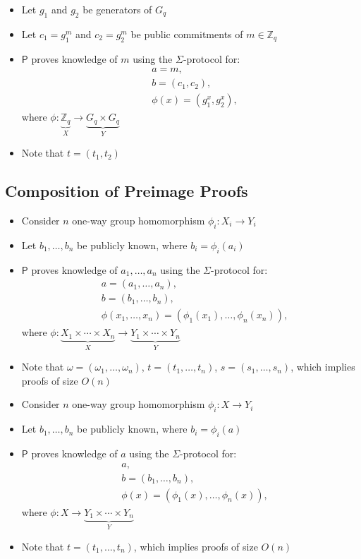 \documentclass[bibtotoc,halfparskip,oneside]{scrreprt}
\newcommand{\Prover}{\ensuremath{\mathsf{P}}\xspace}
\begin{document}
	\begin{itemize}
		\item Let $g_1$ and $g_2$ be generators of $G_q$
		\item Let $c_1=g_1^{m}$ and $c_2=g_2^{m}$ be public commitments of $m\in\mathbb{Z}_q$ 
		\item $\Prover$ proves knowledge of $m$ using the $\Sigma$-protocol for:
		\begin{align*}
			 &a=m,\\
			 &b=(c_1,c_2),\\
			 &\phi(x)=(g_1^{x},g_2^{x}),
		\end{align*}
		where $\phi:\underbrace{\mathbb{Z}_q}_X\rightarrow \underbrace{G_q\times G_q}_Y$
		\item Note that $t=(t_1,t_2)$
	\end{itemize}

\subsection{Composition of Preimage Proofs}

	\begin{itemize}
		\item Consider $n$ one-way group homomorphism $\phi_i:X_i\rightarrow Y_i$ 
		\item Let $b_1,\ldots,b_n$ be publicly known, where $b_i=\phi_i(a_i)$
		\item $\Prover$ proves knowledge of $a_1,\ldots,a_n$ using the $\Sigma$-protocol for:
		\begin{align*}
			&a=(a_1,\ldots,a_n),\\
			&b=(b_1,\ldots,b_n),\\
			&\phi(x_1,\ldots,x_n)=(\phi_1(x_1),\ldots,\phi_n(x_n)),
		\end{align*}
		where $\phi: \underbrace{X_1\times\cdots\times X_n}_X\rightarrow \underbrace{Y_1\times\cdots\times Y_n}_Y$
		\item Note that $\omega=(\omega_1,\ldots,\omega_n)$, $t=(t_1,\ldots,t_n)$, $s=(s_1,\ldots,s_n)$, which implies proofs of size $O(n)$
	\end{itemize}

	\begin{itemize}
		\item Consider $n$ one-way group homomorphism $\phi_i:X\rightarrow Y_i$ 
		\item Let $b_1,\ldots,b_n$ be publicly known, where $b_i=\phi_i(a)$
		\item $\Prover$ proves knowledge of $a$ using the $\Sigma$-protocol for:
		\begin{align*}
			&a,\\
			&b=(b_1,\ldots,b_n),\\
			&\phi(x)=(\phi_1(x),\ldots,\phi_n(x)),
		\end{align*}
		where $\phi: X\rightarrow \underbrace{Y_1\times\cdots\times Y_n}_Y$
		\item Note that $t=(t_1,\ldots,t_n)$, which implies proofs of size $O(n)$
	\end{itemize}
\end{document}
